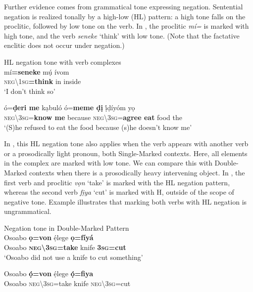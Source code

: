 \documentclass[output=paper]{langsci/langscibook}
\begin{document}
Further evidence comes from grammatical tone expressing negation. Sentential negation is realized tonally by a high-low (HL) pattern: a high tone falls on the proclitic, followed by low tone on the verb. In , the proclitic \textit{mí=} is marked with high tone, and the verb \textit{seneke} ‘think’ with low tone. (Note that the factative enclitic does not occur under negation.)

\ea\label{ex:rolle:52}
{HL negation tone with verb complexes} \\
\gll   mí\textbf{=seneke}      mụ́   ívom\\
     \textsc{neg{\textbackslash}1sg}\textbf{=think}    in   inside\\
\glt ‘I don’t think so’ \citep[32]{Kari2004}
\z

\ea\label{ex:rolle:53}
\gll   ó=\textbf{ḍeri       me}   kạbuló   ó=\textbf{meme     ḍị}   ị́ḍíyóm   yọ\\
     \textsc{neg{\textbackslash}3sg}=\textbf{know  me}    because   \textsc{neg{\textbackslash}3sg}=\textbf{agree   eat}   food   the\\
\glt ‘(S)he refused to eat the food because (s)he doesn’t know me’ \citep[45]{Kari2004}  
\z

In , this HL negation tone also applies when the verb appears with another verb or a prosodically light pronoun, both Single-Marked contexts. Here, all elements in the complex are marked with low tone. We can compare this with Double-Marked contexts when there is a prosodically heavy intervening object. In , the first verb and proclitic \textit{vọn} ‘take’ is marked with the HL negation pattern, whereas the second verb \textit{fịya} ‘cut’ is marked with H, outside of the scope of negative tone. Example  illustrates that marking both verbs with HL negation is ungrammatical. 

\ea\label{ex:rolle:53}
{Negation tone in Double-Marked Pattern}\\
\gll   Osoabo   \textbf{ọ=von}       ẹ́lege   \textbf{ọ=fíyá}\\
     Osoabo   \textbf{\textsc{neg{\textbackslash}3sg}=take}   knife   \textbf{3\textsc{sg}=cut}\\
\glt ‘Osoabo did not use a knife to cut something’ \citep[111]{Kari2004}
\z

\ea\label{ex:rolle:54}
\gll   *Osoabo  \textbf{ọ́=von}       ẹ́lege   \textbf{ọ́=fiya}\\
     Osoabo   \textsc{neg{\textbackslash}3sg}=take   knife   \textsc{neg{\textbackslash}}3\textsc{sg}=cut\\
\z
\end{document}
